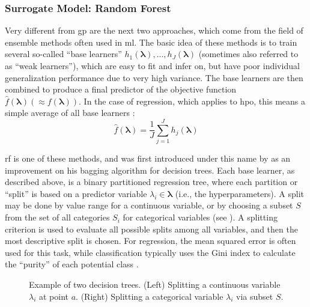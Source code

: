 \subsubsection{Surrogate Model: Random Forest}
\label{chap:rf}
Very different from \gls{gp} are the next two approaches, which come from the field of ensemble methods often used in \gls{ml}. The basic idea of these methods is to train several so-called \enquote{base learners} $h_1(\mathbf{\lambda}), ...,h_J(\mathbf{\lambda})$ (sometimes also referred to as \enquote{weak learners}), which are easy to fit and infer on, but have poor individual generalization performance due to very high variance. The base learners are then combined to produce a final predictor of the objective function $\hat{f}(\mathbf{\lambda}) (\approx f(\mathbf{\lambda}))$. In the case of regression, which applies to \gls{hpo}, this means a simple average of all base learners \cite{cutler2012random}:
\begin{equation}
	\label{eq:avg-est}
	\hat{f}(\mathbf{\lambda}) = \frac{1}{J} \sum_{j=1}^{J} h_j(\mathbf{\lambda})
\end{equation}

\gls{rf} is one of these methods, and was first introduced under this name by \citet{breiman2001random} as an improvement on his bagging algorithm for decision trees.
Each base learner, as described above, is a binary partitioned regression tree, where each partition or \enquote{split} is based on a predictor variable $\lambda_i \in \mathbf{\lambda}$ (i.e., the hyperparameters). A split may be done by value range for a continuous variable, or by choosing a subset $S$ from the set of all categories $S_i$ for categorical variables (see ). A splitting criterion is used to evaluate all possible splits among all variables, and then the most descriptive split is chosen. For regression, the mean squared error is often used for this task, while classification typically uses the Gini index to calculate the \enquote{purity} of each potential class \cite{cutler2012random}. 

\begin{figure}
	\centering
	\caption[Example of decision trees]{Example of two decision trees. (Left) Splitting a continuous variable $\lambda_i$ at point $a$. (Right) Splitting a categorical variable $\lambda_i$ via subset $S$.}
	\label{fig:decision-tree}
\end{figure}

